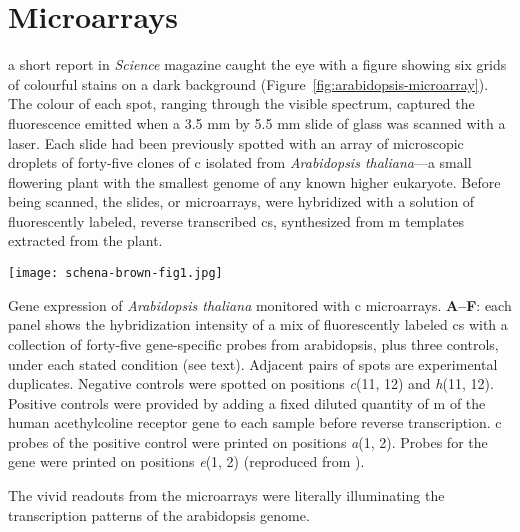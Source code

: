 \section{Microarrays}

 a short report in \emph{Science} magazine caught
the eye with a figure showing six grids of colourful stains on a dark background
(Figure~\ref{fig:arabidopsis-microarray}).  The colour of each spot, ranging
through the visible spectrum, captured the fluorescence emitted when a 3.5 mm by
5.5 mm slide of glass was scanned with a laser.  Each slide had been previously
spotted with an array of microscopic droplets of \mbox{forty-five} clones of
c isolated from \emph{Arabidopsis thaliana}---a small flowering
plant with the smallest genome of any known higher eukaryote.  Before being
scanned, the slides, or microarrays, were hybridized with a solution of
fluorescently labeled, reverse transcribed cs, synthesized from
m templates extracted from the plant.

\begin{marginfigure}%
  \texttt{[image: schena-brown-fig1.jpg]}
  \caption[Gene expression of \emph{Arabidopsis thaliana} monitored with
  c microarrays]{Gene expression of \emph{Arabidopsis thaliana}
    monitored with c microarrays. \textbf{A--F}: each panel shows
    the hybridization intensity of a mix of fluorescently labeled
    cs with a collection of \mbox{forty-five}
    \mbox{gene-specific} probes from arabidopsis, plus three controls, under
    each stated condition (see text).  Adjacent pairs of spots are experimental
    duplicates.  Negative controls were spotted on positions \emph{c}(11, 12)
    and \emph{h}(11, 12).  Positive controls were provided by adding a fixed
    diluted quantity of m of the human acethylcoline receptor
    gene to each sample before reverse transcription.  c probes
    of the positive control were printed on positions \emph{a}(1, 2). Probes for
    the \emph{} gene were printed on positions \emph{e}(1, 2)
    (reproduced from \citealp{schena_quantitative_1995}).}
  \label{fig:arabidopsis-microarray}
\end{marginfigure}

The vivid readouts from the microarrays were literally illuminating the
transcription patterns of the arabidopsis genome.

\bigskip

